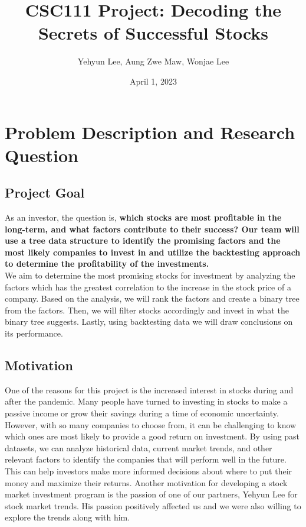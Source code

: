 \documentclass[fontsize=11pt]{article}
\title{CSC111 Project: Decoding the Secrets of Successful Stocks}
\author{Yehyun Lee, Aung Zwe Maw, Wonjae Lee}
\date{April 1, 2023}
\begin{document}
\maketitle
\section{Problem Description and Research Question}

\subsection{Project Goal}
As an investor, the question is, \textbf{which stocks are most profitable in the long-term, and what factors contribute to their success? Our team will use a tree data structure to identify the promising factors and the most likely companies to invest in and utilize the backtesting approach to determine the profitability of the investments.}
\\

We aim to determine the most promising stocks for investment by analyzing the factors which has the greatest correlation to the increase in the stock price of a company. Based on the analysis, we will rank the factors and create a binary tree from the factors. Then, we will filter stocks accordingly and invest in what the binary tree suggests. Lastly, using backtesting data we will draw conclusions on its performance.

\subsection{Motivation}
One of the reasons for this project is the increased interest in stocks during and after the pandemic. Many people have turned to investing in stocks to make a passive income or grow their savings during a time of economic uncertainty. However, with so many companies to choose from, it can be challenging to know which ones are most likely to provide a good return on investment. 
By using past datasets, we can analyze historical data, current market trends, and other relevant factors to identify the companies that will perform well in the future. \\

This can help investors make more informed decisions about where to put their money and maximize their returns. Another motivation for developing a stock market investment program is the passion of one of our partners, Yehyun Lee for stock market trends. His passion positively affected us and we were also willing to explore the trends along with him.
\end{document}
